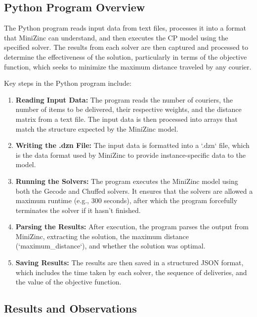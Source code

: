 \documentclass{article}
\begin{document}
\subsection{Python Program Overview}

The Python program reads input data from text files, processes it into a format that MiniZinc can understand, and then executes the CP model using the specified solver. The results from each solver are then captured and processed to determine the effectiveness of the solution, particularly in terms of the objective function, which seeks to minimize the maximum distance traveled by any courier.

Key steps in the Python program include:

\begin{enumerate}
    \item \textbf{Reading Input Data:} The program reads the number of couriers, the number of items to be delivered, their respective weights, and the distance matrix from a text file. The input data is then processed into arrays that match the structure expected by the MiniZinc model.
    
    \item \textbf{Writing the .dzn File:} The input data is formatted into a `.dzn` file, which is the data format used by MiniZinc to provide instance-specific data to the model.
    
    \item \textbf{Running the Solvers:} The program executes the MiniZinc model using both the Gecode and Chuffed solvers. It ensures that the solvers are allowed a maximum runtime (e.g., 300 seconds), after which the program forcefully terminates the solver if it hasn't finished.
    
    \item \textbf{Parsing the Results:} After execution, the program parses the output from MiniZinc, extracting the solution, the maximum distance (`maximum_distance`), and whether the solution was optimal.
    
    \item \textbf{Saving Results:} The results are then saved in a structured JSON format, which includes the time taken by each solver, the sequence of deliveries, and the value of the objective function.
\end{enumerate}

\subsection{Results and Observations}
\end{document}

